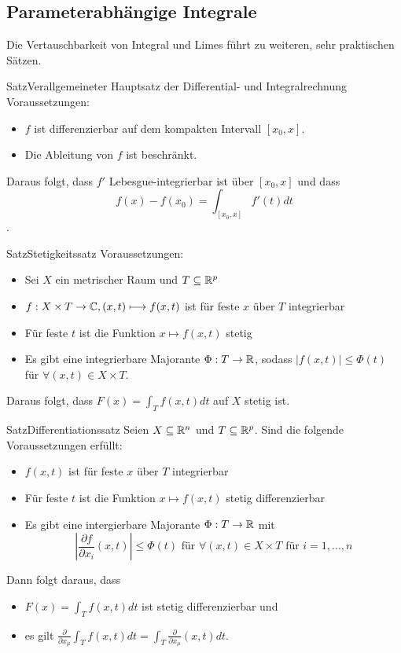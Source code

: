 \subsection{Parameterabhängige Integrale}
Die Vertauschbarkeit von Integral und Limes führt zu weiteren, sehr praktischen Sätzen.
\begin{Satz}{Satz}{Verallgemeineter Hauptsatz der Differential- und Integralrechnung}
Voraussetzungen:
\begin{itemize}
    \item $f$ ist differenzierbar auf dem kompakten Intervall $[x_0, x]$.
    \item Die Ableitung von $f$ ist beschränkt.
\end{itemize}
Daraus folgt, dass $f'$ Lebesgue-integrierbar ist über $[x_0, x]$ und dass $$f(x)-f(x_0)=\int_{[x_0, x]} f'(t)dt$$.
\end{Satz}
\begin{Satz}{Satz}{Stetigkeitssatz}
    Voraussetzungen:
    \begin{itemize}
        \item Sei $X$ ein metrischer Raum und $T\subseteq \mathbb{R}^p$
        \item $f:X\times T\rightarrow \mathbb{C}, (x,t)\longmapsto f(x,t)$ ist für feste $x$ über $T$ integrierbar
        \item Für feste $t$ ist die Funktion $x\longmapsto f(x,t)$ stetig
        \item Es gibt eine integrierbare Majorante $\Phi: T\rightarrow \mathbb{R}$, sodass $|f(x,t)|\leq \Phi(t)$ für $\forall (x,t)\in X\times T$.
    \end{itemize}
    Daraus folgt, dass $F(x)=\int_T f(x,t)dt$ auf $X$ stetig ist.
\end{Satz}
\begin{Satz}{Satz}{Differentiationssatz}
        Seien $X\subseteq \mathbb{R}^n$ und $T\subseteq \mathbb{R}^p$. Sind die folgende Voraussetzungen erfüllt:
    \begin{itemize}
        \item $f(x,t)$ ist für feste $x$ über $T$ integrierbar
        \item Für feste $t$ ist die Funktion $x\longmapsto f(x,t)$ stetig differenzierbar
        \item Es gibt eine intergierbare Majorante $\Phi:T\rightarrow \mathbb{R}$ mit
        $$|\frac{\partial f}{\partial x_i}(x,t)|\leq \Phi(t)\mbox{ für }\forall (x,t)\in X\times T\mbox{ für }i = 1,...,n$$
    \end{itemize}
    Dann folgt daraus, dass
    \begin{itemize}
        \item $F(x)=\int_T f(x,t)dt$ ist stetig differenzierbar und
        \item es gilt $\frac{\partial}{\partial x_\mu}\int_T f(x,t)dt=\int_T \frac{\partial}{\partial x_\mu} (x,t) dt$.
    \end{itemize}
\end{Satz}
